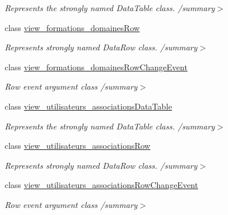 \begin{DoxyCompactItemize}
\begin{DoxyCompactList}\small\item\em Represents the strongly named Data\+Table class. /summary$>$ \end{DoxyCompactList}\item 
class \hyperlink{classforma_1_1formadb_data_set_1_1view__formations__domaines_row}{view\+\_\+formations\+\_\+domaines\+Row}
\begin{DoxyCompactList}\small\item\em Represents strongly named Data\+Row class. /summary$>$ \end{DoxyCompactList}\item 
class \hyperlink{classforma_1_1formadb_data_set_1_1view__formations__domaines_row_change_event}{view\+\_\+formations\+\_\+domaines\+Row\+Change\+Event}
\begin{DoxyCompactList}\small\item\em Row event argument class /summary$>$ \end{DoxyCompactList}\item 
class \hyperlink{classforma_1_1formadb_data_set_1_1view__utilisateurs__associations_data_table}{view\+\_\+utilisateurs\+\_\+associations\+Data\+Table}
\begin{DoxyCompactList}\small\item\em Represents the strongly named Data\+Table class. /summary$>$ \end{DoxyCompactList}\item 
class \hyperlink{classforma_1_1formadb_data_set_1_1view__utilisateurs__associations_row}{view\+\_\+utilisateurs\+\_\+associations\+Row}
\begin{DoxyCompactList}\small\item\em Represents strongly named Data\+Row class. /summary$>$ \end{DoxyCompactList}\item 
class \hyperlink{classforma_1_1formadb_data_set_1_1view__utilisateurs__associations_row_change_event}{view\+\_\+utilisateurs\+\_\+associations\+Row\+Change\+Event}
\begin{DoxyCompactList}\small\item\em Row event argument class /summary$>$ \end{DoxyCompactList}\end{DoxyCompactItemize}
